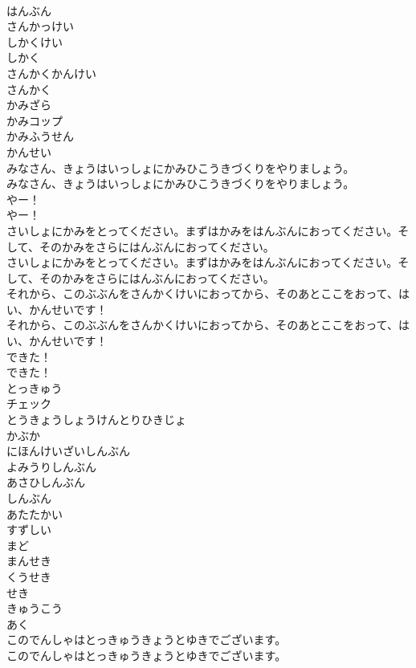 \documentclass[8pt]{extreport}
\begin{document}
\begin{CJK}{UTF8}{min}
\\	はんぶん
\\	さんかっけい
\\	しかくけい
\\	しかく
\\	さんかくかんけい
\\	さんかく
\\	かみざら
\\	かみコップ
\\	かみふうせん
\\	かんせい
\\	みなさん、きょうはいっしょにかみひこうきづくりをやりましょう。	
\\	みなさん、きょうはいっしょにかみひこうきづくりをやりましょう。 
\\	やー！	
\\	やー！ 
\\	さいしょにかみをとってください。まずはかみをはんぶんにおってください。そして、そのかみをさらにはんぶんにおってください。	
\\	さいしょにかみをとってください。まずはかみをはんぶんにおってください。そして、そのかみをさらにはんぶんにおってください。 
\\	それから、このぶぶんをさんかくけいにおってから、そのあとここをおって、はい、かんせいです！	
\\	それから、このぶぶんをさんかくけいにおってから、そのあとここをおって、はい、かんせいです！ 
\\	できた！	
\\	できた！ 
\\	とっきゅう
\\	チェック
\\	とうきょうしょうけんとりひきじょ
\\	かぶか
\\	にほんけいざいしんぶん
\\	よみうりしんぶん
\\	あさひしんぶん
\\	しんぶん
\\	あたたかい
\\	すずしい
\\	まど
\\	まんせき
\\	くうせき
\\	せき
\\	きゅうこう
\\	あく
\\	このでんしゃはとっきゅうきょうとゆきでございます。	
\\	このでんしゃはとっきゅうきょうとゆきでございます。 

\end{CJK}
\end{document}
